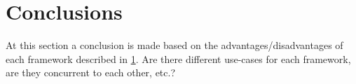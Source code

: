 \section{Conclusions}
\label{sec:conclusions}
At this section a conclusion is made based on the advantages/disadvantages of each framework
described in \ref{sec:conclusions}.
Are there different use-cases for each framework, are they concurrent to each other, etc.?